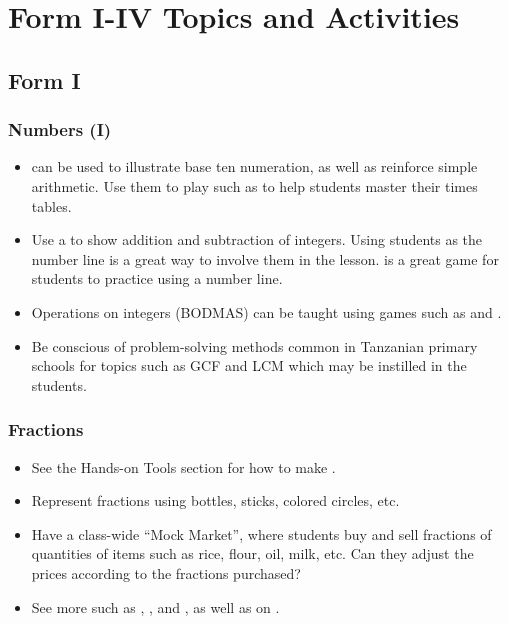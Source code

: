 \chapter{Form I-IV Topics and Activities}

\section{Form I}

	\subsection{Numbers (I)} \label{numbers}
	\begin{itemize}
	\item{} can be used to illustrate base ten numeration, as well as reinforce simple arithmetic. Use them to play  such as  to help students master their times tables.
	\item Use a  to show addition and subtraction of integers. Using students as the number line is a great way to involve them in the lesson.  is a great game for students to practice using a number line.
	\item Operations on integers (BODMAS) can be taught using games such as  and .
	\item Be conscious of problem-solving methods common in Tanzanian primary schools for topics such as GCF and LCM which may be instilled in the students. 
	\end{itemize}
	
	\subsection{Fractions} \label{fractions}
	\begin{itemize}
	\item See the Hands-on Tools section for how to make .
	\item Represent fractions using bottles, sticks, colored circles, etc.
	\item Have a class-wide ``Mock Market'', where students buy and sell fractions of quantities of items such as rice, flour, oil, milk, etc. Can they adjust the prices according to the fractions purchased?
	\item See more  such as , ,  and , as well as  on .
	\end{itemize}
	
